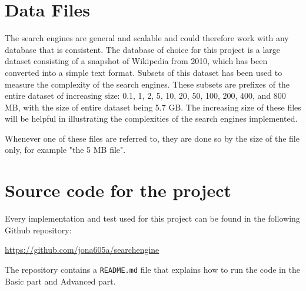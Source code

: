 \section{Data Files}

The search engines are general and scalable and could therefore work with any database that is consistent. The database of choice for this project is a large dataset consisting of a snapshot of Wikipedia from 2010, which has been converted into a simple text format. Subsets of this dataset has been used to measure the complexity of the search engines. These subsets are prefixes of the entire dataset of increasing size: 0.1, 1, 2, 5, 10, 20, 50, 100, 200, 400, and 800 MB, with the size of entire dataset being 5.7 GB. The increasing size of these files will be helpful in illustrating the complexities of the search engines implemented. 

Whenever one of these files are referred to, they are done so by the size of the file only, for example "the 5 MB file". 

\section{Source code for the project}

Every implementation and test used for this project can be found in the following Github repository: 

\begin{center}
\begin{tcolorbox}[width=\textwidth, colframe={lightgray}, arc=0mm, colbacktitle=gray, coltitle=black] 
\begin{center}
        \href{https://github.com/jona605a/searchengine}{https://github.com/jona605a/searchengine}
\end{center}
\end{tcolorbox}
\end{center}

The repository contains a \texttt{README.md} file that explains how to run the code in the Basic part and Advanced part. 
